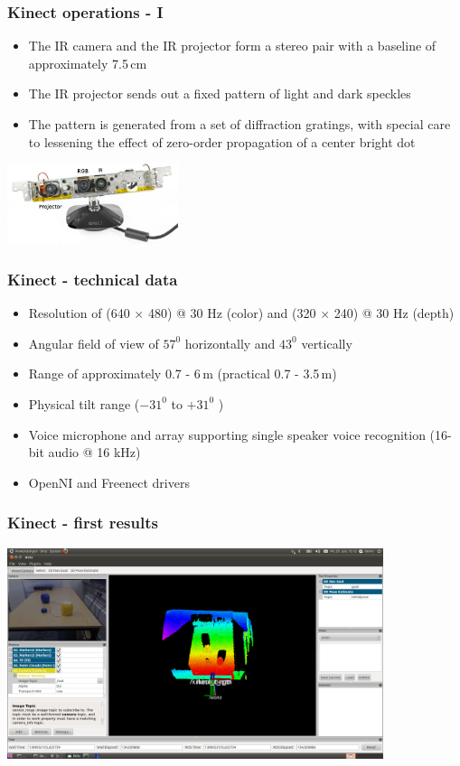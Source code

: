\documentclass[t]{beamer}
\begin{document}
\begin{frame}
 \frametitle{Kinect operations - I}

\begin{itemize}
  \item The IR camera and the IR projector form a stereo pair with a baseline of approximately 7.5\,cm
  \item The IR projector sends out a fixed pattern of light and dark speckles
  \item The pattern is generated from a set of diffraction gratings, with special care to lessening the effect of zero-order propagation of a center bright dot
\end{itemize}
\hspace{35ex}\includegraphics[width=5cm]{img/kinect2.png} 
\end{frame}

\begin{frame}
 \frametitle{Kinect - technical data}
\begin{itemize}
  \item Resolution of (640 $\times$ 480) @ 30 Hz (color) and (320 $\times$ 240) @ 30 Hz (depth)
  \item Angular field of view of $57^0$ horizontally and $43^0$ vertically
  \item Range of approximately 0.7 - 6\,m (practical 0.7 - 3.5\,m)
  \item Physical tilt range ($-31^0$  to $+31^0$ )
  \item Voice microphone and array supporting single speaker voice recognition (16-bit audio @ 16 kHz)
  \item OpenNI and Freenect drivers
\end{itemize}

\end{frame}


\begin{frame} 
 \frametitle{Kinect - first results}
\includegraphics[width=11cm]{img/ros_rviz.png}
\end{frame}
\end{document}
